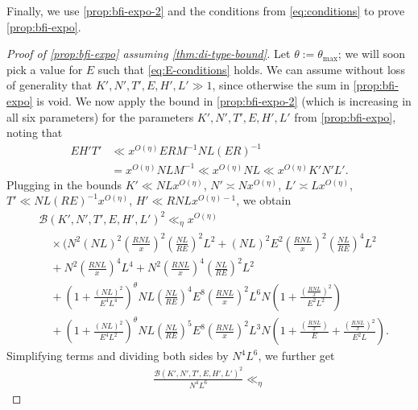 \documentclass[reqno,11pt]{amsart}
\theoremstyle{definition}
\theoremstyle{remark}
\numberwithin{equation}{section}
\newcommand{\mB}{\mathcal{B}}
\begin{document}
Finally, we use \cref{prop:bfi-expo-2} and the conditions from \cref{eq:conditions} to prove \cref{prop:bfi-expo}.

\begin{proof}[Proof of \cref{prop:bfi-expo} assuming \cref{thm:di-type-bound}]
Let $\theta := \theta_{\max}$; we will soon pick a value for $E$ such that \cref{eq:E-conditions} holds. We can assume without loss of generality that $K', N', T', E, H', L' \gg 1$, since otherwise the sum in \cref{prop:bfi-expo} is void. %
We now apply the bound in \cref{prop:bfi-expo-2} (which is increasing in all six parameters) for the parameters $K', N', T', E, H', L'$ from \cref{prop:bfi-expo}, noting that 
\[
\begin{aligned}
    EH'T' &\ll x^{O(\eta)} ERM^{-1} NL (ER)^{-1} 
    \\
    &= x^{O(\eta)} NL M^{-1} 
    \ll x^{O(\eta)} NL
    \ll x^{O(\eta)} K' N' L'.
\end{aligned}
\]
Plugging in the bounds $K' \ll NL x^{O(\eta)}$, $N' \asymp N x^{O(\eta)}$, $L' \asymp L x^{O(\eta)}$, $T' \ll NL(RE)^{-1} x^{O(\eta)}$, $H' \ll RNL x^{O(\eta)-1}$, we obtain
\[
\begin{aligned}
    &\mB(K', N', T', E, H', L')^2 \ll_\eta x^{O(\eta)}
    \\
    &\quad \times \Bigg( N^2 (NL)^2 \left(\frac{RNL}{x}\right)^2 \left(\frac{NL}{RE}\right)^2 L^2 + (NL)^2 E^2 \left(\frac{RNL}{x}\right)^2 \left(\frac{NL}{RE}\right)^4 L^2 
    \\
    &\quad + N^2 \left(\frac{RNL}{x}\right)^4 L^4 + N^2 \left(\frac{RNL}{x}\right)^4 \left(\frac{NL}{RE}\right)^2 L^2
    \\
    &\quad + \left(1 + \frac{(NL)^2}{E^4L^4}\right)^\theta NL \left(\frac{NL}{RE}\right)^4 E^8 \left(\frac{RNL}{x}\right)^2 L^6 N \left(1 + \frac{\left(\frac{RNL}{x}\right)^2}{E^2 L^2}\right)
    \\
    &\quad + \left(1 + \frac{(NL)^2}{E^4L^2} \right)^\theta NL \left(\frac{NL}{RE}\right)^5 E^8 \left(\frac{RNL}{x}\right)^2 L^3 N \left(1 + \frac{\left(\frac{RNL}{x}\right)}{E} + \frac{\left(\frac{RNL}{x}\right)^2}{E^2 L}\right).
\end{aligned}
\]
Simplifying terms and dividing both sides by $N^4 L^6$, we further get
\[
\begin{aligned}
    \frac{\mB(K', N', T', E, H', L')^2}{N^4 L^6} \ll_\eta 

\end{aligned}\]
\end{proof}
\end{document}
